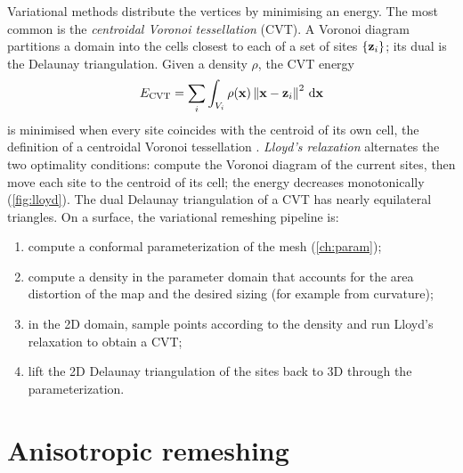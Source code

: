 Variational methods distribute the vertices by minimising an energy. The most common is the
\emph{centroidal Voronoi tessellation} (CVT). A Voronoi diagram partitions a domain into the cells
closest to each of a set of sites $\{\mathbf{z}_i\}$; its dual is the Delaunay triangulation. Given a
density $\rho$, the CVT energy
\begin{equation}
E_{\mathrm{CVT}}=\sum_i\int_{V_i}\rho(\mathbf{x})\left\lVert \mathbf{x}-\mathbf{z}_i\right\rVert^2\,\mathrm{d}\mathbf{x}
\end{equation}
is minimised when every site coincides with the centroid of its own cell, the definition of a
centroidal Voronoi tessellation \citep{Du1999}. \emph{Lloyd's relaxation} \citep{Lloyd1982}
alternates the two optimality conditions: compute the Voronoi diagram of the current sites, then
move each site to the centroid of its cell; the energy decreases monotonically
(\cref{fig:lloyd}). The dual Delaunay triangulation of a CVT has nearly equilateral triangles. On a
surface, the variational remeshing pipeline is:
\begin{enumerate}
  \item compute a conformal parameterization of the mesh (\cref{ch:param});
  \item compute a density in the parameter domain that accounts for the area distortion of the map
  and the desired sizing (for example from curvature);
  \item in the 2D domain, sample points according to the density and run Lloyd's relaxation to
  obtain a CVT;
  \item lift the 2D Delaunay triangulation of the sites back to 3D through the parameterization.
\end{enumerate}


\section{Anisotropic remeshing}

